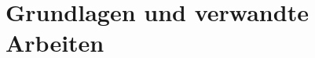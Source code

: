 
\chapter{Grundlagen und verwandte Arbeiten}
\newpage
\null
\newpage
\null
\newpage
\null
\newpage
\null
\newpage
\null
\newpage
\null
\newpage
\null
